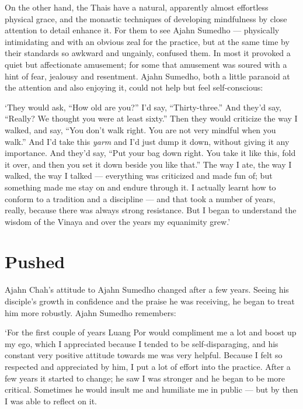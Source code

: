 On the other hand, the Thais have a natural, apparently almost
effortless physical grace, and the monastic techniques of developing
mindfulness by close attention to detail enhance it. For them to see
Ajahn Sumedho --- physically intimidating and with an obvious zeal for
the practice, but at the same time by their standards so awkward and
ungainly, confused them. In most it provoked a quiet but affectionate
amusement; for some that amusement was soured with a hint of fear,
jealousy and resentment. Ajahn Sumedho, both a little paranoid at the
attention and also enjoying it, could not help but feel self-conscious:

`They would ask, ``How old are you?'' I'd say, ``Thirty-three.'' And
they'd say, ``Really? We thought you were at least sixty.'' Then they
would criticize the way I walked, and say, ``You don't walk right. You
are not very mindful when you walk.'' And I'd take this \emph{yarm} and
I'd just dump it down, without giving it any importance. And they'd say,
``Put your bag down right. You take it like this, fold it over, and then
you set it down beside you like that.'' The way I ate, the way I walked,
the way I talked --- everything was criticized and made fun of; but
something made me stay on and endure through it. I actually learnt how
to conform to a tradition and a discipline --- and that took a number of
years, really, because there was always strong resistance. But I began
to understand the wisdom of the Vinaya and over the years my equanimity
grew.'

\section{Pushed}

Ajahn Chah's attitude to Ajahn Sumedho changed after a few years. Seeing
his disciple's growth in confidence and the praise he was receiving, he
began to treat him more robustly. Ajahn Sumedho remembers:

`For the first couple of years Luang Por would compliment me a lot and
boost up my ego, which I appreciated because I tended to be
self-disparaging, and his constant very positive attitude towards me was
very helpful. Because I felt so respected and appreciated by him, I put
a lot of effort into the practice. After a few years it started to
change; he saw I was stronger and he began to be more critical.
Sometimes he would insult me and humiliate me in public --- but by then
I was able to reflect on it.

